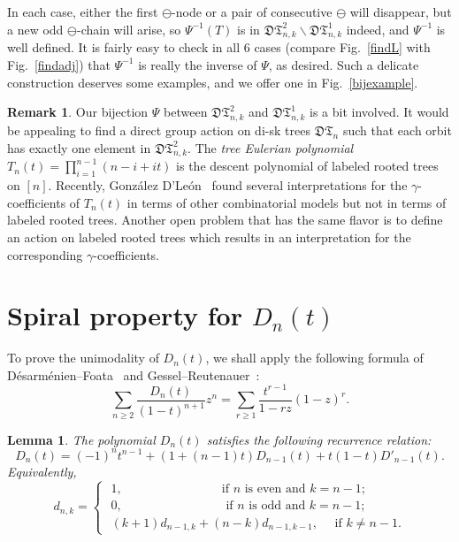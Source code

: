 \documentclass[12pt]{amsart}
\numberwithin{equation}{section}
\theoremstyle{plain}
\newtheorem{lemma}[theorem]{Lemma}
\theoremstyle{definition}
\newtheorem{remark}[theorem]{Remark}
\def\D{\mathfrak{D}}
\def\T{\mathfrak{T}}
\begin{document}
In each case, either the first $\ominus$-node or a pair of consecutive $\ominus$ will disappear, but a new odd $\ominus$-chain will arise, so $\Psi^{-1}(T)$ is in $\D\T^{2}_{n,k}\backslash \D\T^{1}_{n,k}$ indeed, and $\Psi^{-1}$ is well defined. It is fairly easy to check in all 6 cases (compare Fig.~\ref{findL} with Fig.~\ref{findadj}) that $\Psi^{-1}$ is really the inverse of $\Psi$, as desired.
Such a delicate construction deserves some examples, and we offer one in Fig.~\ref{bijexample}.


\begin{remark}
Our bijection $\Psi$ between $\D\T_{n,k}^{2}$ and $\D\T_{n,k}^{1}$ is a bit involved. It would be appealing to find a direct group action on di-sk trees $\D\T_n$ such that each orbit has exactly one element in $\D\T_{n,k}^{2}$. The {\em tree Eulerian polynomial} $T_n(t)=\prod_{i=1}^{n-1}(n-i+it)$ is the descent polynomial of labeled  rooted trees on $[n]$. Recently, Gonz\'alez D'Le\'on~\cite{go} found several  interpretations  for the $\gamma$-coefficients of  $T_n(t)$ in terms of other combinatorial models but not in terms of labeled rooted trees.
Another  open problem that has the same flavor is to 
define an action on labeled rooted trees which results in  an interpretation for the corresponding $\gamma$-coefficients.  
\end{remark}

\section{Spiral property for $D_n(t)$}
\label{sec:spiral}


 To prove the unimodality of $D_n(t)$, we shall apply the following formula of 
 D\'esarm\'enien--Foata~\cite{df} and Gessel--Reutenauer~\cite{ge}:
\begin{equation}\label{gessel}
 \sum_{n\geq2}\frac{D_n(t)}{(1-t)^{n+1}}z^n=\sum_{r\geq1}\frac{t^{r-1}}{1-rz}(1-z)^r.
\end{equation}
 
 \begin{lemma}
 The polynomial $D_n(t)$ satisfies the following recurrence relation:
 \begin{equation}\label{der}
 D_n(t)=(-1)^nt^{n-1}+(1+(n-1)t)D_{n-1}(t)+t(1-t)D'_{n-1}(t).
 \end{equation}
 Equivalently, 
 \begin{equation}\label{recu:der}
 d_{n,k}=
 \begin{cases}
 \,\,1, \qquad\qquad\qquad\qquad\text{if $n$ is even and $k=n-1$;}\\
 \,\,0,\,\,\qquad\qquad\qquad\qquad \text{if $n$ is odd and $k=n-1$;}\\
 \,\,(k+1)d_{n-1,k}+(n-k)d_{n-1,k-1},\,\,\quad\text{if $k\neq n-1$}.
 \end{cases}
 \end{equation}
 \end{lemma}
 
\end{document}
